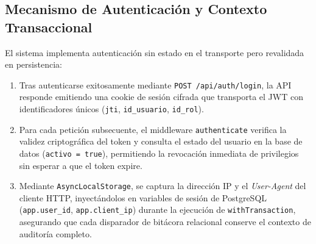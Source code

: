 \subsection{Mecanismo de Autenticación y Contexto Transaccional}
El sistema implementa autenticación sin estado en el transporte pero revalidada en persistencia:
\begin{enumerate}
    \item Tras autenticarse exitosamente mediante \texttt{POST /api/auth/login}, la API responde emitiendo una cookie de sesión cifrada que transporta el JWT con identificadores únicos (\texttt{jti}, \texttt{id\_usuario}, \texttt{id\_rol}).
    \item Para cada petición subsecuente, el middleware \texttt{authenticate} verifica la validez criptográfica del token y consulta el estado del usuario en la base de datos (\texttt{activo = true}), permitiendo la revocación inmediata de privilegios sin esperar a que el token expire.
    \item Mediante \texttt{AsyncLocalStorage}, se captura la dirección IP y el \textit{User-Agent} del cliente HTTP, inyectándolos en variables de sesión de PostgreSQL (\texttt{app.user\_id}, \texttt{app.client\_ip}) durante la ejecución de \texttt{withTransaction}, asegurando que cada disparador de bitácora relacional conserve el contexto de auditoría completo.
\end{enumerate}
